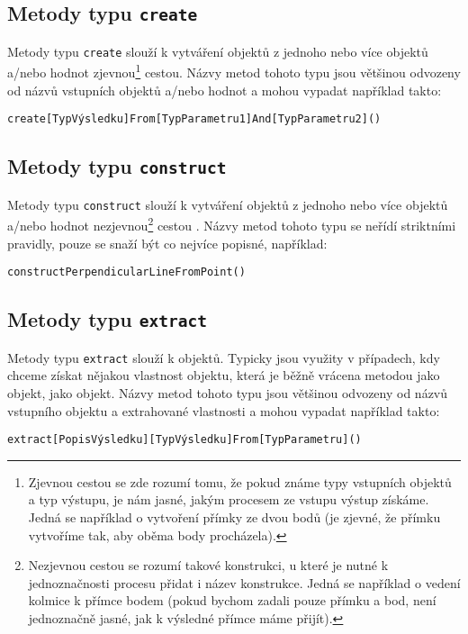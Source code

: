 \subsection[Create]{Metody typu \texttt{create}}
\label{subsec:create-methods}

Metody typu \texttt{create} slouží k vytváření objektů z jednoho nebo více objektů a/nebo hodnot zjevnou\footnote{Zjevnou cestou se zde rozumí tomu, že pokud známe typy vstupních objektů a typ výstupu, je nám jasné, jakým procesem ze vstupu výstup získáme. Jedná se například o vytvoření přímky ze dvou bodů (je zjevné, že přímku vytvoříme tak, aby oběma body procházela).} cestou\cite{geometryjs:wiki:geometryObjects}.
Názvy metod tohoto typu jsou většinou odvozeny od názvů vstupních objektů a/nebo hodnot a mohou vypadat například takto: 

\texttt{create[TypVýsledku]From[TypParametru1]And[TypParametru2]()}

\subsection[Construct]{Metody typu \texttt{construct}}
\label{subsec:construct-methods}

Metody typu \texttt{construct} slouží k vytváření objektů z jednoho nebo více objektů a/nebo hodnot nezjevnou\footnote{Nezjevnou cestou se rozumí takové konstrukci, u které je nutné k jednoznačnosti procesu přidat i název konstrukce. Jedná se například o vedení kolmice k přímce bodem (pokud bychom zadali pouze přímku a bod, není jednoznačně jasné, jak k výsledné přímce máme přijít).} cestou \cite{geometryjs:wiki:geometryObjects}.
Názvy metod tohoto typu se neřídí striktními pravidly, pouze se snaží být co nejvíce popisné, například:

\texttt{constructPerpendicularLineFromPoint()}

\subsection[Extract]{Metody typu \texttt{extract}}
\label{subsec:extract-methods}

Metody typu \texttt{extract} slouží k  objektů.
Typicky jsou využity v případech, kdy chceme získat nějakou vlastnost objektu, která je běžně vrácena metodou jako  objekt, jako  objekt\cite{geometryjs:wiki:geometryObjects}.
Názvy metod tohoto typu jsou většinou odvozeny od názvů vstupního objektu a extrahované vlastnosti a mohou vypadat například takto:

\texttt{extract[PopisVýsledku][TypVýsledku]From[TypParametru]()}